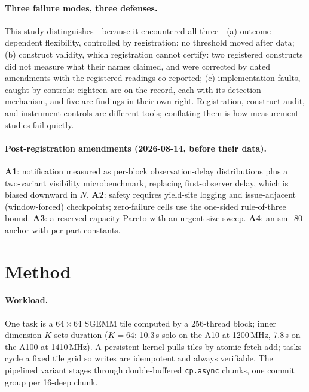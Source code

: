 \documentclass[11pt]{article}
\newcommand{\us}{\,\textmu s\xspace}
\begin{document}
\paragraph{Three failure modes, three defenses.} This study
distinguishes---because it encountered all three---(a)
outcome-dependent flexibility, controlled by registration: no
threshold moved after data; (b) construct validity, which
registration cannot certify: two registered constructs did not
measure what their names claimed, and were corrected by dated
amendments with the registered readings co-reported; (c)
implementation faults, caught by controls: eighteen are on the
record, each with its detection mechanism, and five are findings in
their own right. Registration, construct audit, and instrument
controls are different tools; conflating them is how measurement
studies fail quietly.

\paragraph{Post-registration amendments (2026-08-14, before their
data).} \textbf{A1}: notification measured as per-block
observation-delay distributions plus a two-variant visibility
microbenchmark, replacing first-observer delay, which is biased
downward in $N$. \textbf{A2}: safety requires yield-site logging and
issue-adjacent (window-forced) checkpoints; zero-failure cells use
the one-sided rule-of-three bound. \textbf{A3}: a reserved-capacity
Pareto with an urgent-size sweep. \textbf{A4}: an sm\_80 anchor with
per-part constants.

\section{Method}
\label{sec:method}

\paragraph{Workload.} One task is a $64{\times}64$ SGEMM tile
computed by a 256-thread block; inner dimension $K$ sets duration
($K{=}64$: 10.3\us{} solo on the A10 at 1200\,MHz, 7.8\us{} on the
A100 at 1410\,MHz). A persistent kernel pulls tiles by atomic
fetch-add; tasks cycle a fixed tile grid so writes are idempotent and
always verifiable. The pipelined variant stages through
double-buffered \texttt{cp.async} chunks, one commit group per
16-deep chunk.
\end{document}
